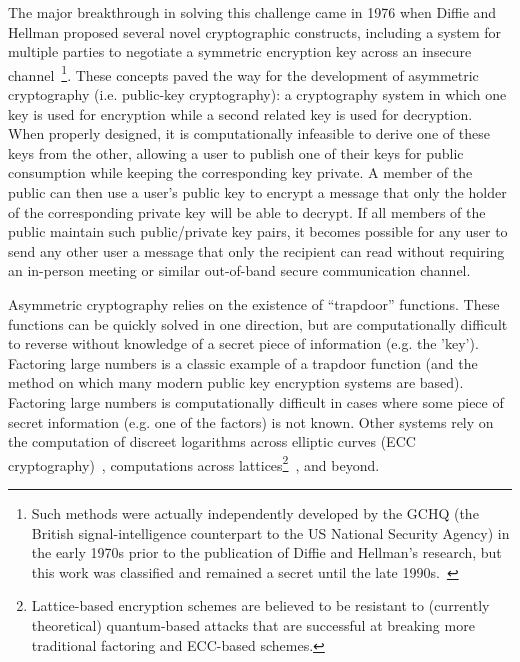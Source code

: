 The major breakthrough in solving this challenge came in 1976 when
Diffie and Hellman proposed several novel cryptographic constructs,
including a system for multiple parties to negotiate a symmetric
encryption key across an insecure
channel~\cite{diffie1976}\footnote{Such methods were actually
  independently developed by the GCHQ (the British signal-intelligence
  counterpart to the US National Security Agency) in the early 1970s
  prior to the publication of Diffie and Hellman's research, but this
  work was classified and remained a secret until the late
  1990s.~\cite{singh1999}}. These concepts paved the way for the
development of asymmetric cryptography (i.e. public-key cryptography):
a cryptography system in which one key is used for encryption while a
second related key is used for decryption. When properly designed, it
is computationally infeasible to derive one of these keys from the
other, allowing a user to publish one of their keys for public
consumption while keeping the corresponding key private. A member of
the public can then use a user's public key to encrypt a message that
only the holder of the corresponding private key will be able to
decrypt. If all members of the public maintain such public/private key
pairs, it becomes possible for any user to send any other user a
message that only the recipient can read without requiring an
in-person meeting or similar out-of-band secure communication channel.

Asymmetric cryptography relies on the existence of ``trapdoor''
functions. These functions can be quickly solved in one direction, but
are computationally difficult to reverse without knowledge of a secret
piece of information (e.g. the 'key'). Factoring large numbers is a
classic example of a trapdoor function (and the method on which many
modern public key encryption systems are based). Factoring large
numbers is computationally difficult in cases where some piece of
secret information (e.g. one of the factors) is not known. Other
systems rely on the computation of discreet logarithms across elliptic
curves (ECC cryptography)~\cite{koblitz1987, miller1986}, computations
across lattices\footnote{Lattice-based encryption schemes are believed
  to be resistant to (currently theoretical) quantum-based attacks
  that are successful at breaking more traditional factoring and
  ECC-based schemes.}~\cite{ajtai1996}, and beyond.

